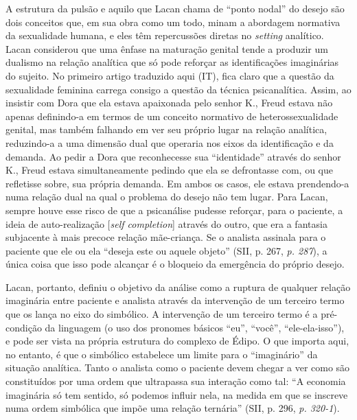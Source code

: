 A estrutura da pulsão e aquilo que Lacan chama de ``ponto nodal'' do
desejo são dois conceitos que, em sua obra como um todo, minam a
abordagem normativa da sexualidade humana, e eles têm repercussões
diretas no \emph{setting} analítico. Lacan considerou que uma ênfase na
maturação genital tende a produzir um dualismo na relação analítica que
só pode reforçar as identificações imaginárias do sujeito. No primeiro
artigo traduzido aqui (IT), fica claro que a questão da sexualidade
feminina carrega consigo a questão da técnica psicanalítica. Assim, ao
insistir com Dora que ela estava apaixonada pelo senhor K., Freud estava
não apenas definindo-a em termos de um conceito normativo de
heterossexualidade genital, mas também falhando em ver seu próprio lugar
na relação analítica, reduzindo-a a uma dimensão dual que operaria nos
eixos da identificação e da demanda. Ao pedir a Dora que reconhecesse
sua ``identidade'' através do senhor K., Freud estava simultaneamente
pedindo que ela se defrontasse com, ou que refletisse sobre, sua própria
demanda. Em ambos os casos, ele estava prendendo-a numa relação dual na
qual o problema do desejo não tem lugar. Para Lacan, sempre houve esse
risco de que a psicanálise pudesse reforçar, para o paciente, a ideia de
auto-realização {[}\emph{self completion}{]} através do outro, que era a
fantasia subjacente à mais precoce relação mãe-criança. Se o analista
assinala para o paciente que ele ou ela ``deseja este ou aquele objeto''
(SII, p. 267, \emph{p. 287}), a única coisa que isso pode alcançar é o
bloqueio da emergência do próprio desejo.

Lacan, portanto, definiu o objetivo da análise como a ruptura de
qualquer relação imaginária entre paciente e analista através da
intervenção de um terceiro termo que os lança no eixo do simbólico. A
intervenção de um terceiro termo é a pré-condição da linguagem (o uso
dos pronomes básicos ``eu'', ``você'', ``ele-ela-isso''), e pode ser
vista na própria estrutura do complexo de Édipo. O que importa aqui, no
entanto, é que o simbólico estabelece um limite para o ``imaginário'' da
situação analítica. Tanto o analista como o paciente devem chegar a ver
como são constituídos por uma ordem que ultrapassa sua interação como
tal: ``A economia imaginária só tem sentido, só podemos influir nela, na
medida em que se inscreve numa ordem simbólica que impõe uma relação
ternária'' (SII, p. 296, \emph{p. 320-1}).

